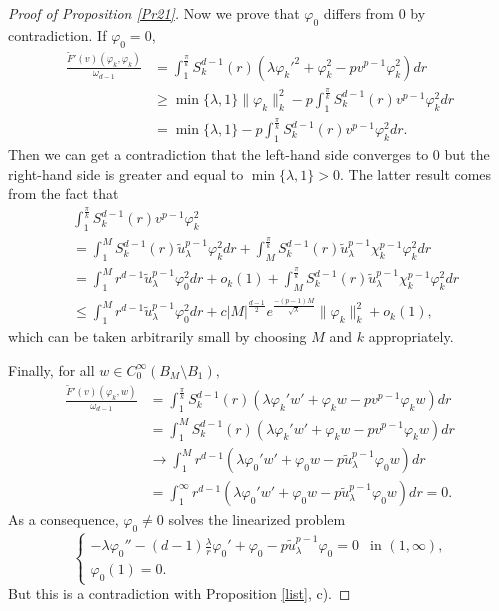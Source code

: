 \documentclass[reqno]{amsart}
\numberwithin{equation}{section}
\newenvironment{key words}{\textbf{Keywords}\mbox{  }}{ }
\begin{document}
\begin{proof}[Proof of Proposition \ref{Pr21}]
Now we prove that $\varphi_{0}$ differs from $0$ by contradiction. If $\varphi_{0}=0$,
 \begin{align*}
  \frac{\tilde{F}'(v)(\varphi_{k},\varphi_{k})}{\omega_{d-1}} &=\int_{1}^{\frac{\pi}{k}}S^{d-1}_{k}(r)(\lambda \varphi_{k}'^{2}+ \varphi_{k}^{2}-pv^{p-1}\varphi_{k}^{2})dr\\
     &\geq \min\{\lambda,1\}\|\varphi_{k}\|_k^{2}-p\int_{1}^{\frac{\pi}{k}}S^{d-1}_{k}(r)v^{p-1}\varphi_{k}^{2}dr\\
     &=\min\{\lambda,1\}-p\int_{1}^{\frac{\pi}{k}}S^{d-1}_{k}(r)v^{p-1}\varphi_{k}^{2}dr.
\end{align*}
Then we can get a contradiction that the left-hand side converges to $0$ but the right-hand side is greater and equal to $\min\{\lambda,1\}>0.$ The latter result comes from the fact that
\begin{align*}
   &\int_{1}^{\frac{\pi}{k}}S^{d-1}_{k}(r)v^{p-1}\varphi_{k}^{2}\\
   &=\int_{1}^{M}S^{d-1}_{k}(r)\tilde{u}_\lambda^{p-1}\varphi_{k}^{2}dr+\int_{M}^{\frac{\pi}{k}}S^{d-1}_{k}(r)\tilde{u}_\lambda^{p-1}\chi_{k}^{p-1}\varphi_{k}^{2}dr\\
   &=\int_{1}^{M}r^{d-1}\tilde{u}_\lambda^{p-1}\varphi_{0}^{2}dr+o_k(1)+\int_{M}^{\frac{\pi}{k}}S^{d-1}_{k}(r)\tilde{u}_\lambda^{p-1}\chi_{k}^{p-1}\varphi_{k}^{2}dr\\
   &\leq \int_{1}^{M}r^{d-1}\tilde{u}_\lambda^{p-1}\varphi_{0}^{2}dr+c|M|^{\frac{d-1}{2}}e^{\frac{-(p-1)M}{\sqrt{\lambda}}}\|\varphi_{k}\|_k^{2} + o_k(1),
\end{align*}
which can be taken arbitrarily small by choosing $M$ and $k$ appropriately.

Finally, for all $w\in C_{0}^{\infty}(B_{M}\setminus B_{1}),$
\begin{align*}
\frac{\tilde{F}'(v)(\varphi_{k},w)}{\omega_{d-1}}&=\int_{1}^{\frac{\pi}{k}}S^{d-1}_{k}(r)(\lambda \varphi_{k}'w'+ \varphi_{k}w-pv^{p-1}\varphi_{k}w)dr\\
&=\int_{1}^{M}S^{d-1}_{k}(r)(\lambda \varphi_{k}'w'+ \varphi_{k}w-pv^{p-1}\varphi_{k}w)dr\\
&\rightarrow \int_{1}^{M}r^{d-1}(\lambda \varphi_{0}'w'+ \varphi_{0}w-p\tilde{u}_\lambda^{p-1}\varphi_{0}w)dr\\
&= \int_{1}^{\infty}r^{d-1}(\lambda \varphi_{0}'w'+ \varphi_{0}w-p\tilde{u}_\lambda^{p-1}\varphi_{0}w)dr=0.
\end{align*}
As a consequence, $\varphi_{0} \neq 0$ solves the linearized problem
\begin{equation*}
\begin{cases}
-\lambda \varphi_{0}''-(d-1)\frac{\lambda}{r}\varphi_{0}'+\varphi_{0}-p\tilde{u}_\lambda^{p-1}\varphi_{0}=0 &\mbox{in $(1,\infty)$,}\\
\varphi_0(1)=0.
\end{cases}
\end{equation*}
But this is a contradiction with Proposition \ref{list}, c).


\end{proof}
\end{document}

